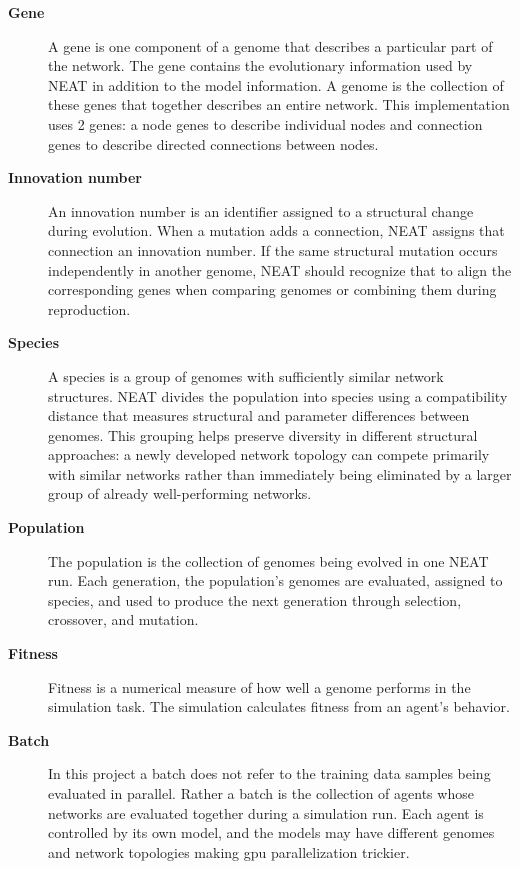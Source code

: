 \documentclass[11pt]{article}
\begin{document}
\begin{description}
    \item[\textbf{Gene}]
    A gene is one component of a genome that describes a particular part
    of the network. The gene contains the evolutionary information used by NEAT in addition to the model information. A genome is the collection of
    these genes that together describes an entire network. This implementation uses 2 genes: a node genes to describe
    individual nodes and connection genes to describe directed connections
    between nodes.

    \item[\textbf{Innovation number}]
    An innovation number is an identifier assigned to a
    structural change during evolution. When a mutation adds
    a connection, NEAT assigns that connection an innovation number. If
    the same structural mutation occurs independently in another genome,
    NEAT should recognize that to align the
    corresponding genes when comparing genomes or combining them during
    reproduction.

    \item[\textbf{Species}]
    A species is a group of genomes with sufficiently similar network
    structures. NEAT divides the population into species using a
    compatibility distance that measures structural and parameter
    differences between genomes. This grouping helps preserve diversity in different
    structural approaches: a newly developed network topology can compete
    primarily with similar networks rather than immediately being
    eliminated by a larger group of already well-performing networks.

    \item[\textbf{Population}]
    The population is the collection of genomes being evolved in one NEAT
    run. Each generation, the population's genomes are evaluated, assigned
    to species, and used to produce the next generation through selection,
    crossover, and mutation.

    \item[\textbf{Fitness}]
    Fitness is a numerical measure of how well a genome performs in the
    simulation task. The simulation calculates fitness from an agent's
    behavior.

    \item[\textbf{Batch}]
    In this project a batch does not refer to the training data samples being evaluated in parallel. Rather a batch is the collection of agents whose networks are evaluated
    together during a simulation run. Each agent is controlled by its own
    model, and the models may have different genomes and network
    topologies making gpu parallelization trickier. 


\end{description}
\end{document}
